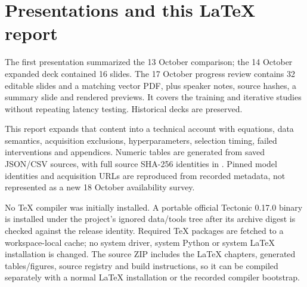 \section{Presentations and this LaTeX report}
The first presentation summarized the 13 October comparison; the 14 October expanded deck contained 16 slides. The 17 October progress review contains 32 editable slides and a matching vector PDF, plus speaker notes, source hashes, a summary slide and rendered previews. It covers the training and iterative studies without repeating latency testing. Historical decks are preserved.

This report expands that content into a technical account with equations, data semantics, acquisition exclusions, hyperparameters, selection timing, failed interventions and appendices. Numeric tables are generated from saved JSON/CSV sources, with full source SHA-256 identities in . Pinned model identities and acquisition URLs are reproduced from recorded metadata, not represented as a new 18 October availability survey.

No TeX compiler was initially installed. A portable official Tectonic 0.17.0 binary is installed under the project's ignored data/tools tree after its archive digest is checked against the release identity. Required TeX packages are fetched to a workspace-local cache; no system driver, system Python or system LaTeX installation is changed. The source ZIP includes the LaTeX chapters, generated tables/figures, source registry and build instructions, so it can be compiled separately with a normal LaTeX installation or the recorded compiler bootstrap.

